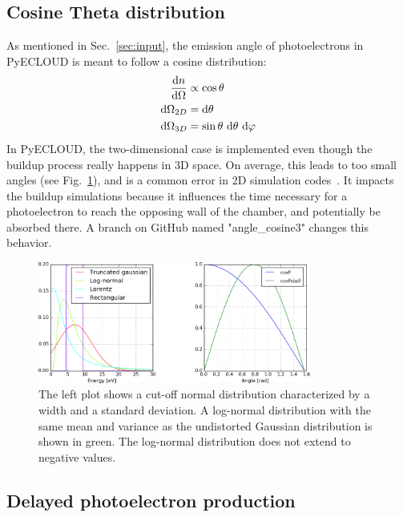 
\subsection{Cosine Theta distribution}
\label{sec:cosine3D}
As mentioned in Sec.~\ref{sec:input}, the emission angle of photoelectrons in PyECLOUD is meant to follow a cosine distribution:
\begin{align}
    \frac{\text{d}n}{\text{d}\Omega} &\propto \cos\theta
    \\
    \text{d}\Omega_{2D} &= \text{d}\theta
    \\
    \text{d}\Omega_{3D} &= \sin\theta~\text{d}\theta~\text{d}\varphi
    \label{eq:angles}
\end{align}
In PyECLOUD, the two-dimensional case is implemented even though the buildup process really happens in 3D space.
On average, this leads to too small angles (see Fig.~\ref{fig:distribution}), and is a common error in 2D simulation codes~\cite{angle}.
It impacts the buildup simulations because it influences the time necessary for a photoelectron to reach the opposing wall of the chamber, and potentially be absorbed there.
A branch on GitHub named "angle\_cosine3" changes this behavior.
%
%

\begin{figure}[tbh]
    \centering
    \includegraphics[width=0.8\textwidth]{../plots/distributions.png}
    \caption{
        The left plot shows a cut-off normal distribution characterized by a width and a standard deviation.
        A log-normal distribution with the same mean and variance as the undistorted Gaussian distribution is shown in green.
    The log-normal distribution does not extend to negative values.
    }
    \label{fig:distribution}
\end{figure}


\subsection{Delayed photoelectron production}
\label{sec:delay}

